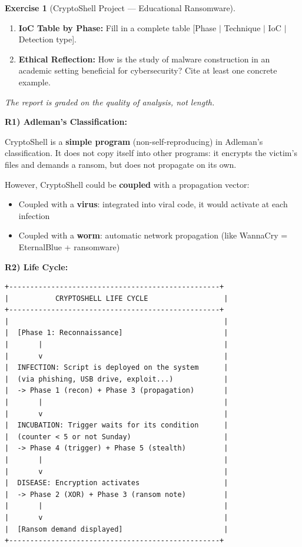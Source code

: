 \documentclass[a4paper,11pt]{article}
\theoremstyle{plain}
\theoremstyle{definition}
\newtheorem{exercice}{Exercise}
\begin{document}
\begin{exercice}[CryptoShell Project --- Educational Ransomware]
\begin{enumerate}
\item[\textbf{R5)}] \textbf{IoC Table by Phase:} Fill in a complete table [Phase $|$ Technique $|$ IoC $|$ Detection type].

\item[\textbf{R6)}] \textbf{Ethical Reflection:} How is the study of malware construction in an academic setting beneficial for cybersecurity? Cite at least one concrete example.
\end{enumerate}

\medskip
\noindent\textit{The report is graded on the quality of analysis, not length.}

\begin{correction}

\textbf{R1) Adleman's Classification:}

CryptoShell is a \textbf{simple program} (non-self-reproducing) in Adleman's classification. It does not copy itself into other programs: it encrypts the victim's files and demands a ransom, but does not propagate on its own.

However, CryptoShell could be \textbf{coupled} with a propagation vector:
\begin{itemize}
    \item Coupled with a \textbf{virus}: integrated into viral code, it would activate at each infection
    \item Coupled with a \textbf{worm}: automatic network propagation (like WannaCry = EternalBlue + ransomware)
\end{itemize}

\medskip
\textbf{R2) Life Cycle:}
\begin{lstlisting}[numbers=none,frame=none,backgroundcolor=\color{white},language={}]
+--------------------------------------------------+
|           CRYPTOSHELL LIFE CYCLE                  |
+--------------------------------------------------+
|                                                   |
|  [Phase 1: Reconnaissance]                        |
|       |                                           |
|       v                                           |
|  INFECTION: Script is deployed on the system      |
|  (via phishing, USB drive, exploit...)            |
|  -> Phase 1 (recon) + Phase 3 (propagation)       |
|       |                                           |
|       v                                           |
|  INCUBATION: Trigger waits for its condition      |
|  (counter < 5 or not Sunday)                      |
|  -> Phase 4 (trigger) + Phase 5 (stealth)         |
|       |                                           |
|       v                                           |
|  DISEASE: Encryption activates                    |
|  -> Phase 2 (XOR) + Phase 3 (ransom note)         |
|       |                                           |
|       v                                           |
|  [Ransom demand displayed]                        |
+--------------------------------------------------+
\end{lstlisting}


\end{correction}
\end{exercice}
\end{document}
